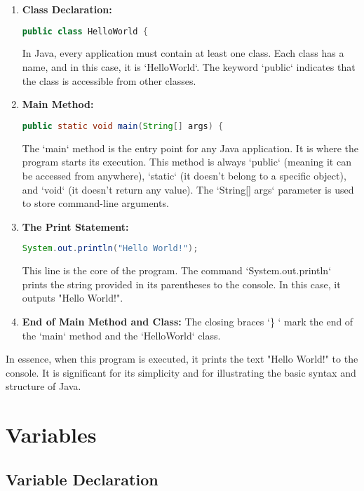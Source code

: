 \documentclass{article}
\begin{document}
\begin{enumerate}
  \item \textbf{Class Declaration:}
  \begin{lstlisting}[language=Java]
public class HelloWorld {
  \end{lstlisting}
  In Java, every application must contain at least one class. Each class has a name, and in this case, it is `HelloWorld`. The keyword `public` indicates that the class is accessible from other classes.

  \item \textbf{Main Method:}
  \begin{lstlisting}[language=Java]
public static void main(String[] args) {
  \end{lstlisting}
  The `main` method is the entry point for any Java application. It is where the program starts its execution. This method is always `public` (meaning it can be accessed from anywhere), `static` (it doesn't belong to a specific object), and `void` (it doesn't return any value). The `String[] args` parameter is used to store command-line arguments.

  \item \textbf{The Print Statement:}
  \begin{lstlisting}[language=Java]
System.out.println("Hello World!");
  \end{lstlisting}
  This line is the core of the program. The command `System.out.println` prints the string provided in its parentheses to the console. In this case, it outputs "Hello World!".

  \item \textbf{End of Main Method and Class:}
  The closing braces `\} ` mark the end of the `main` method and the `HelloWorld` class.
\end{enumerate}

\begin{text}
    In essence, when this program is executed, it prints the text "Hello World!" to the console. It is significant for its simplicity and for illustrating the basic syntax and structure of Java.
\end{text}


\section{Variables}
\subsection{Variable Declaration}
\end{document}
